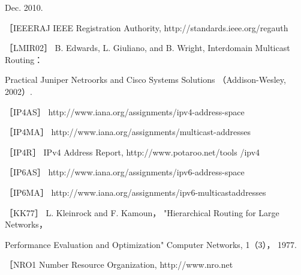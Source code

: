 Dec. 2010.

［IEEERAJ IEEE Registration Authority, http://standards.ieee.org/regauth

［LMIR02］ B. Edwards, L. Giuliano, and B. Wright, Interdomain Multicast Routing：

Practical Juniper Netroorks and Cisco Systems Solutions （Addison-Wesley, 2002）.

［IP4AS］ http://www.iana.org/assignments/ipv4-address-space

［IP4MA］ http://www.iana.org/assignments/multicast-addresses

［IP4R］ IPv4 Address Report, http://www.potaroo.net/tools /ipv4

［IP6AS］ http://www.iana.org/assignments/ipv6-address-space

［IP6MA］ http://www.iana.org/assignments/ipv6-multicastaddresses

［KK77］ L. Kleinrock and F. Kamoun， "Hierarchical Routing for Large Networks，

Performance Evaluation and Optimization" Computer Networks, 1（3）， 1977.

［NRO1 Number Resource Organization, http://www.nro.net